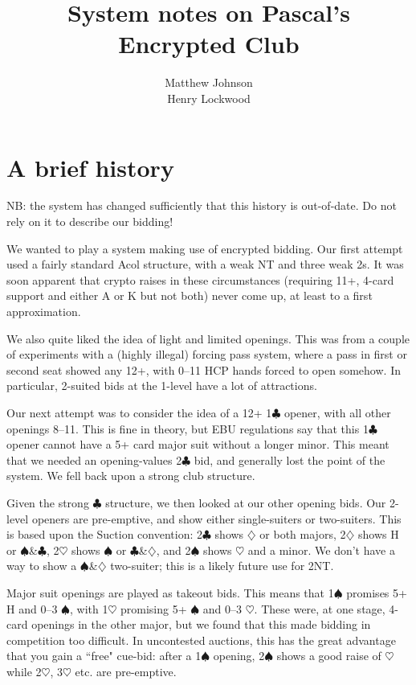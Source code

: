 \documentclass[a4paper,12pt]{article}
\author{Matthew Johnson\\Henry Lockwood}
\title{System notes on Pascal's Encrypted Club}
\begin{document}
\maketitle

\section{A brief history}

NB: the system has changed sufficiently that this history is out-of-date.  Do
not rely on it to describe our bidding!

We wanted to play a system making use of encrypted bidding.  Our first attempt
used a fairly standard Acol structure, with a weak NT and three weak 2s.  It
was soon apparent that crypto raises in these circumstances (requiring 11+,
4-card support and either A or K but not both) never come up, at least to a
first approximation.

We also quite liked the idea of light and limited openings.  This was from a
couple of experiments with a (highly illegal) forcing pass system, where a pass
in first or second seat showed any 12+, with 0--11 HCP hands forced to open
somehow.  In particular, 2-suited bids at the 1-level have a lot of
attractions.

Our next attempt was to consider the idea of a 12+ 1$\clubsuit$ opener, with all other
openings 8--11.  This is fine in theory, but EBU regulations say that this 1$\clubsuit$
opener cannot have a 5+ card major suit without a longer minor.  This meant
that we needed an opening-values 2$\clubsuit$ bid, and generally lost the point of the
system.  We fell back upon a strong club structure.

Given the strong $\clubsuit$ structure, we then looked at our other opening bids.  Our
2-level openers are pre-emptive, and show either single-suiters or two-suiters.
This is based upon the Suction convention: 2$\clubsuit$ shows $\diamondsuit$ or both majors, 2$\diamondsuit$ shows
H or $\spadesuit$\&$\clubsuit$, 2$\heartsuit$ shows $\spadesuit$ or $\clubsuit$\&$\diamondsuit$, and 2$\spadesuit$ shows $\heartsuit$ and a minor.  We don't have a way
to show a $\spadesuit$\&$\diamondsuit$ two-suiter; this is a likely future use for 2NT.

Major suit openings are played as takeout bids.  This means that 1$\spadesuit$ promises 5+
H and 0--3 $\spadesuit$, with 1$\heartsuit$ promising 5+ $\spadesuit$ and 0--3 $\heartsuit$.  These were, at one stage,
4-card openings in the other major, but we found that this made bidding in
competition too difficult.  In uncontested auctions, this has the great
advantage that you gain a ``free" cue-bid: after a 1$\spadesuit$ opening, 2$\spadesuit$ shows a good
raise of $\heartsuit$ while 2$\heartsuit$, 3$\heartsuit$ etc. are pre-emptive.
\end{document}
